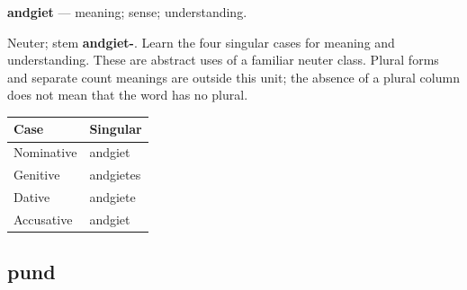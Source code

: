 \par\begin{minipage}{\linewidth}\raggedright
\textbf{andgiet} — meaning; sense; understanding.

Neuter; stem \textbf{andgiet-}. Learn the four singular cases for meaning and understanding. These are abstract uses of a familiar neuter class. Plural forms and separate count meanings are outside this unit; the absence of a plural column does not mean that the word has no plural.

\par\begingroup
\fontsize{10.5}{13.2}\selectfont
\setlength{\LTleft}{0pt}\setlength{\LTright}{\fill}
\noindent
\begin{tabular}{@{}>{\raggedright\arraybackslash}p{60.59mm}>{\raggedright\arraybackslash}p{60.59mm}@{}}
\toprule
\textbf{Case} & \textbf{Singular} \\
\midrule
Nominative & andgiet \\
Genitive & andgietes \\
Dative & andgiete \\
Accusative & andgiet \\
\bottomrule
\end{tabular}
\par\endgroup

\end{minipage}\par
{}
\subsection*{pund}

